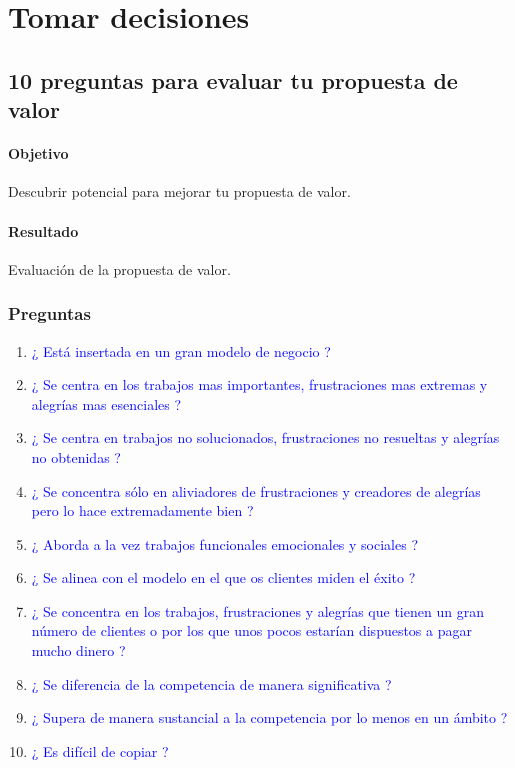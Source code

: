 \documentclass[11pt]{book}
\begin{document}
\section{Tomar decisiones}
\subsection{10 preguntas para evaluar tu propuesta de valor}
\paragraph{Objetivo}
Descubrir potencial para mejorar tu propuesta de valor. 
\paragraph{Resultado}
Evaluación de la propuesta de valor.
\subsubsection{Preguntas}
\begin{enumerate}
\item \textcolor{blue}{¿ Está insertada en un gran modelo de negocio ?}
\item \textcolor{blue}{¿ Se centra en los trabajos mas importantes, frustraciones mas extremas y alegrías mas esenciales ?}
\item \textcolor{blue}{¿ Se centra en trabajos no solucionados, frustraciones no resueltas y alegrías no obtenidas ?}
\item \textcolor{blue}{¿ Se concentra sólo en aliviadores de frustraciones y creadores de alegrías pero lo hace extremadamente bien ?}
\item \textcolor{blue}{¿ Aborda a la vez trabajos funcionales emocionales y sociales ?}
\item \textcolor{blue}{¿ Se alinea con el modelo en el que os clientes miden el éxito ?}
\item \textcolor{blue}{¿ Se concentra en los trabajos, frustraciones y alegrías que tienen un gran número de clientes o por los que unos pocos estarían dispuestos a pagar mucho dinero ?}
\item \textcolor{blue}{¿ Se diferencia de la competencia de manera significativa ?}
\item \textcolor{blue}{¿ Supera de manera sustancial a la competencia por lo menos en un ámbito ?}
\item \textcolor{blue}{¿ Es difícil de copiar ?}
\end{enumerate}
\end{document}
